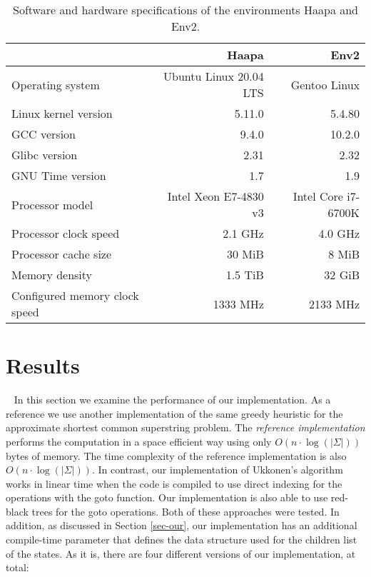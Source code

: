 \documentclass[english,twoside,censored,csm,algorithms-track-2020]{HYthesisML}
\theoremstyle{plain}
\theoremstyle{definition}
\numberwithin{testexample}{chapter}
\begin{document}
\begin{table}
\begin{tabular}{l|r|r}
  & \textbf{Haapa} & \textbf{Env2} \\
  \hline
  Operating system & Ubuntu Linux 20.04 LTS & Gentoo Linux \footnotemark \\
  Linux kernel version & 5.11.0 & 5.4.80 \\
  GCC version & 9.4.0 & 10.2.0 \\
  Glibc version & 2.31 & 2.32 \\
  GNU Time version & 1.7 & 1.9 \\
  \hline
  Processor model & Intel Xeon E7-4830 v3 & Intel Core i7-6700K \\
  Processor clock speed & 2.1 GHz & 4.0 GHz \\
  Processor cache size & 30 MiB & 8 MiB \\
  Memory density & 1.5 TiB & 32 GiB \\
  Configured memory clock speed & 1333 MHz & 2133 MHz \\
\end{tabular}
\caption{Software and hardware specifications of the environments Haapa and Env2.}
\label{tbl-sys}
\end{table}




\section{Results}~\label{sec-results}
In this section we examine the performance of our implementation. As a reference we use another
implementation of the same greedy heuristic for the approximate shortest common superstring problem.
The {\em reference implementation} \citep{Alanko17} performs the computation in a space efficient way using
only $O(n \cdot\log(|\Sigma|))$ bytes of memory. The time complexity of the reference implementation
is also $O(n \cdot\log(|\Sigma|))$. In contrast, our implementation of Ukkonen's algorithm
works in linear time when the code is compiled to use direct indexing for the operations with
the goto function. Our implementation is also able to use red-black trees for the goto
operations. Both of these approaches were tested.
In addition, as discussed in Section
\ref{sec-our}, our implementation has an additional compile-time parameter that defines the data
structure used for the children list of the states. As it is, there are four different versions of
our implementation, at total:
\end{document}
